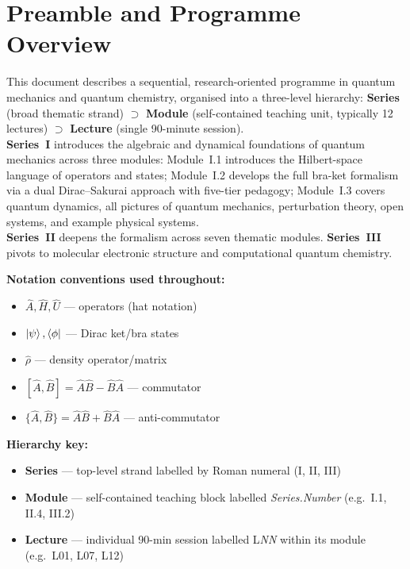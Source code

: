 \documentclass[11pt,a4paper]{article}
\newcommand{\coursebadge}[1]{%
  \begin{tcolorbox}[highlightbox]#1\end{tcolorbox}%
}
\begin{document}
\section*{Preamble and Programme Overview}

\coursebadge{%
  This document describes a sequential, research-oriented programme in quantum
  mechanics and quantum chemistry, organised into a three-level hierarchy:
  \textbf{Series} (broad thematic strand) $\supset$ \textbf{Module} (self-contained
  teaching unit, typically 12 lectures) $\supset$ \textbf{Lecture} (single 90-minute
  session).\\[4pt]
  \textbf{Series~I} introduces the algebraic and dynamical foundations of quantum
  mechanics across three modules:
  Module~I.1 introduces the Hilbert-space language of operators and states;
  Module~I.2 develops the full bra-ket formalism via a dual Dirac--Sakurai approach
  with five-tier pedagogy;
  Module~I.3 covers quantum dynamics, all pictures of quantum mechanics, perturbation
  theory, open systems, and example physical systems.\\[2pt]
  \textbf{Series~II} deepens the formalism across seven thematic modules.
  \textbf{Series~III} pivots to molecular electronic structure and computational
  quantum chemistry.
}

\medskip
\noindent\textbf{Notation conventions used throughout:}
\begin{itemize}[leftmargin=1.5em]
  \item $\hat{A}, \hat{H}, \hat{U}$ --- operators (hat notation)
  \item $\ket{\psi}, \bra{\phi}$ --- Dirac ket/bra states
  \item $\hat{\rho}$ --- density operator/matrix
  \item $[\hat{A},\hat{B}]=\hat{A}\hat{B}-\hat{B}\hat{A}$ --- commutator
  \item $\{\hat{A},\hat{B}\}=\hat{A}\hat{B}+\hat{B}\hat{A}$ --- anti-commutator
\end{itemize}

\medskip
\noindent\textbf{Hierarchy key:}
\begin{itemize}[leftmargin=1.5em]
  \item \textbf{Series} --- top-level strand labelled by Roman numeral (I, II, III)
  \item \textbf{Module} --- self-contained teaching block labelled \textit{Series.Number}
    (e.g.\ I.1, II.4, III.2)
  \item \textbf{Lecture} --- individual 90-min session labelled L\textit{NN} within its
    module (e.g.\ L01, L07, L12)
\end{itemize}
\end{document}
